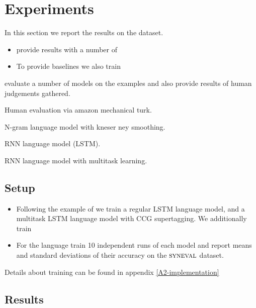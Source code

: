 \section{Experiments}

In this section we report the results on the dataset.

\begin{itemize}
  \item \citet{linzen2018targeted} provide results with a number of
  \item To provide baselines we also train
\end{itemize}

evaluate a number of models on the examples and also provide results of human judgements gathered.
  \item Human evaluation via amazon mechanical turk.
  \item N-gram language model with kneser ney smoothing.
  \item RNN language model (LSTM).
  \item RNN language model with multitask learning.

\subsection{Setup}
\begin{itemize}
  \item Following the example of \citet{linzen2018targeted} we train a regular LSTM language model, and a multitask LSTM language model with CCG supertagging. We additionally train
  \item For the language train 10 independent runs of each model and report means and standard deviations of their accuracy on the $\textsc{syneval}$ dataset.
  \
\end{itemize}

Details about training can be found in appendix \ref{A2-implementation}

\subsection{Results}
